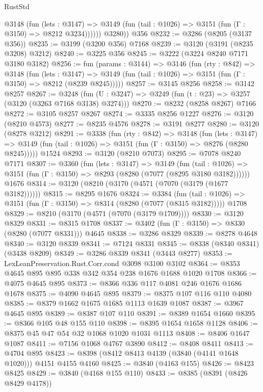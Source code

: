 \begin{lexlean}{RustStd}
\begin{coremodule}
{\begin{coremodule}
{{{{{{{{{{{{{{{{{{{{{{{{{{            @3148
              (fun (lets : @3147) =>
              @3149 (fun (tail : @1026) => @3151 (fun (Γ : @3150) => @8212 @3234))))))
        @3280))
    @356
@8232 := @3286 (@8205 (@3137 @356))
@8235 := @3199 (@3200 @356) @7168
@8239 := @3120 (@3191 (@8235 @3208) @3212)
@8240 := @3225 @356
@8245 := @3222 (@3224 @8240 @7171 @3180 @3182)
@8256 := fun (params : @3144) =>
  @3146
    (fun (rty : @842) =>
    @3148
      (fun (lets : @3147) =>
      @3149 (fun (tail : @1026) => @3151 (fun (Γ : @3150) => @8212 (@8239 @8245)))))
@8257 := @3145 @8256
@8258 := @3142 @8257
@8267 := @3248 (fun (U : @3247) => @3249 (fun (t : @23) => @3257 (@3120 (@3263 @7168 @3138) @3274)))
@8270 := @8232 (@8258 @8267) @7166
@8272 := @3105 @8257 @8267
@8274 := @3335 @8256 @1227
@8276 := @3120 (@8210 @4573)
@8277 := @8235 @4576
@8278 := @3191 @8277
@8280 := @3120 (@8278 @3212)
@8291 := @3338
    (fun (rty : @842) =>
    @3148
      (fun (lets : @3147) =>
      @3149 (fun (tail : @1026) => @3151 (fun (Γ : @3150) => @8276 (@8280 @8245)))))
    @1524
@8293 := @3120 (@8210 @7073)
@8295 := @7078 @8240 @7171
@8307 := @3360
    (fun (lets : @3147) =>
    @3149
      (fun (tail : @1026) => @3151 (fun (Γ : @3150) => @8293 (@8280 (@7077 (@8295 @3180 @3182))))))
    @1676
@8314 := @3120 (@8210 (@3170 (@4571 (@7070 (@3179 (@1677 @3182))))))
@8315 := @8295 @1676
@8324 := @3384
    (fun (tail : @1026) => @3151 (fun (Γ : @3150) => @8314 (@8280 (@7077 (@8315 @3182)))))
    @1708
@8329 := @8210 (@3170 (@4571 (@7070 (@3179 @1709))))
@8330 := @3120 @8329
@8331 := @8315 @1708
@8337 := @3402 (fun (Γ : @3150) => @8330 (@8280 (@7077 @8331))) @4645
@8338 := @3286 @8329
@8339 := @8278 @4648
@8340 := @3120 @8339
@8341 := @7124 @8331
@8345 := @8338 (@8340 @8341) (@3438 @8209)
@8349 := @3286 @8339 @8341 (@3443 @8277)
@8353 := LexLeanPreservation.Rust.Corr.cond @3098 @3100 @3102
@8364 := @8353 @4645 @895 @895 @338 @342 @354 @238 @1676 @1688 @1020 @1708
@8366 := @4075 @4645 @895
@8373 := @8366 @336 @117 @4081 @246 @1676 @1686 @1678
@8375 := @4090 @4645 @895
@8379 := @8375 @107 @116 @110 @4080
@8385 := @8379 @1662 @1675 @1685 @1113 @1639 @1087
@8387 := @3967 @4645 @895
@8389 := @8387 @107 @110
@8391 := @8389 @1654 @1660
@8395 := @8366 @105 @48 @155 @110
@8398 := @8395 @1654 @1658 @1128
@8406 := @8375 @45 @47 @54 @32 @1068 @1020 @1031 @1113
@8408 := @8406 @1647 @1087
@8411 := @7156 @1068 @4767 @3890
@8412 := @8408 @8411
@8413 := @4704 @895
@8423 := @8398 (@8412 @8413 @4139 (@3840 (@4141 @1648 @1020))) @4151 @4155 @4160
@8425 := @3840 (@4163 @155)
@8426 := @8423 @8425
@8429 := @3840 (@4168 @155 @110)
@8433 := @8385 (@8391 (@8426 @8429 @4178))
}}}}}}}}}}}}}}}}}}}}}}}}}}
\end{coremodule}}
\end{coremodule}
\end{lexlean}
